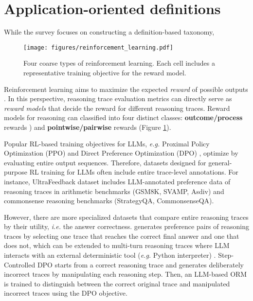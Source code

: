\section{Application-oriented definitions}

While the survey focuses on constructing a definition-based taxonomy,  

\begin{figure}
    \centering
    \texttt{[image: figures/reinforcement\_learning.pdf]}
    \caption{Four coarse types of reinforcement learning. Each cell includes a representative training objective for the reward model.}
    \label{fig:reinforcement-learning}
\end{figure}

Reinforcement learning aims to maximize the expected \textit{reward} of possible outputs \citep{wang2024reinforcementlearningenhancedllms}. In this perspective, reasoning trace evaluation metrics can directly serve as \textit{reward models} that decide the reward for different reasoning traces. Reward models for reasoning can classified into four distinct classes: \textbf{outcome/process} rewards \citep{uesato2022solvingmathwordproblems, luo2024improvemathematicalreasoninglanguage, jiang2024technicalreportenhancingllm}) and \textbf{pointwise/pairwise} rewards \citep{lee-etal-2023-learning} (Figure \ref{fig:reinforcement-learning}).

Popular RL-based training objectives for LLMs, \textit{e.g.} Proximal Policy Optimization (PPO) \citep{schulman2017proximalpolicyoptimizationalgorithms} and Direct Preference Optimization (DPO) \citep{NEURIPS2023_a85b405e}, optimize by evaluating entire output sequences. Therefore, datasets designed for general-purpose RL training for LLMs often include entire trace-level annotations. For instance, UltraFeedback dataset \citep{cui2024ultrafeedbackboostinglanguagemodels} includes LLM-annotated preference data of reasoning traces in arithmetic benchmarks (GSM8K, SVAMP, Asdiv) and commonsense reasoning benchmarks (StrategyQA, CommonsenseQA).

However, there are more specialized datasets that compare entire reasoning traces by their utility, \textit{i.e.} the answer correctness. \citet{pang2024iterativereasoningpreferenceoptimization} generates preference pairs of reasoning traces by selecting one trace that reaches the correct final answer and one that does not, which can be extended to multi-turn reasoning traces where LLM interacts with an external deterministic tool (\textit{e.g.} Python interpreter) \citet{xiong2024buildingmathagentsmultiturn}. Step-Controlled DPO \citep{lu2024stepcontrolleddpoleveragingstepwise} starts from a correct reasoning trace and generates deliberately incorrect traces by manipulating each reasoning step. Then, an LLM-based ORM is trained to distinguish between the correct original trace and manipulated incorrect traces using the DPO objective.


